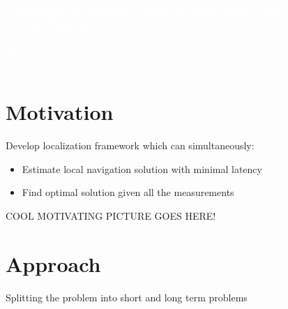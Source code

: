 \documentclass[%
    fourtothree=true, %
    DepLogo=true     %
    ]{ETHpres}
\newcommand*{\ETHtitle}{Closed-Loop Multi-Sensor SLAM for Fixed-Wing UAVs.}
\newcommand*{\ETHauthor}{Adam Radomski}
\begin{document}
\ETHtitelbild\textcolor{white}{\large\textbf{\ETHtitle}}\\~\newline\hspace{6mm}\normalsize%
\textcolor{white}{
\textbf{\ETHauthor}\\ \\
Master Thesis\\
Supervised by Timo Hinzmann, Thomas Schneider}\\


\ETHslide
\section*{Motivation}
Develop localization framework which can simultaneously:
\begin{itemize}
	\item[\ETHitem] Estimate local navigation solution with minimal latency
	\item[\ETHitem] Find optimal solution given all the measurements
\end{itemize}

\vspace*{2\baselineskip}
COOL MOTIVATING PICTURE GOES HERE!

\clearpage

\ETHslide
\section*{Approach}
Splitting the problem into short and long term problems
\end{document}
